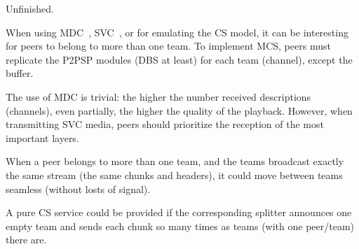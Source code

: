
\label{sec:MCS}

\begin{note}
  Unfinished.
\end{note}

When using MDC~\cite{baccichet2007content}, SVC~\cite{chu2009auction},
or for emulating the CS model, it can be interesting for peers to
belong to more than one team. To implement MCS, peers must replicate
the P2PSP modules (DBS at least) for each team (channel), except the
buffer.

The use of MDC is trivial: the higher the number received descriptions
(channels), even partially, the higher the quality of the
playback. However, when transmitting SVC media, peers should
prioritize the reception of the most important layers.

When a peer belongs to more than one team, and the teams broadcast exactly
the same stream (the same chunks and headers), it could move between
teams seamless (without losts of signal).

A pure CS service could be provided if the corresponding splitter
announces one empty team and sends each chunk so many times as teams
(with one peer/team) there are.
